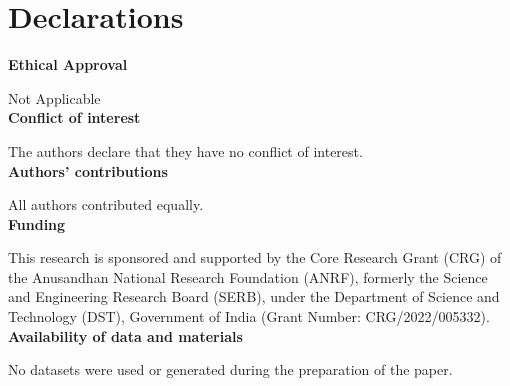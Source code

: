\documentclass[14pt]{article}
\theoremstyle{Definition}
\theoremstyle{remark}
\begin{document}
\section{Declarations}

  
 {\bf Ethical Approval}

 Not Applicable\\
 
 
 
 {\bf Conflict of interest}
 
 The authors declare that they have no conflict of interest.\\
 
 
 {\bf Authors' contributions}
 
 All authors contributed equally. \\
 
 
 {\bf Funding}
 
  
This research is sponsored and supported by the Core Research Grant (CRG) of the Anusandhan National Research Foundation (ANRF), formerly the Science and Engineering Research Board (SERB), under the Department of Science and Technology (DST), Government of India (Grant Number: CRG/2022/005332).\\
 
 
 {\bf Availability of data and materials}
 
 No datasets were used or generated during the preparation of the paper.\\
\end{document}
